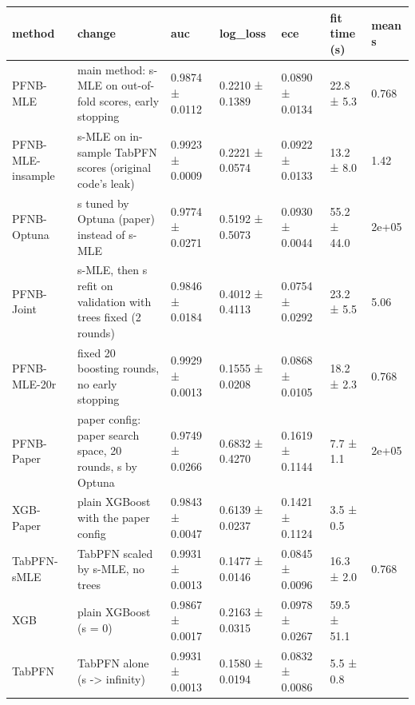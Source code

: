 \begin{tabular}{lllllll}
\toprule
method & change & auc & log\_loss & ece & fit time (s) & mean s \\
\midrule
PFNB-MLE & main method: s-MLE on out-of-fold scores, early stopping & 0.9874 ± 0.0112 & 0.2210 ± 0.1389 & 0.0890 ± 0.0134 & 22.8 ± 5.3 & 0.768 \\
PFNB-MLE-insample & s-MLE on in-sample TabPFN scores (original code's leak) & 0.9923 ± 0.0009 & 0.2221 ± 0.0574 & 0.0922 ± 0.0133 & 13.2 ± 8.0 & 1.42 \\
PFNB-Optuna & s tuned by Optuna (paper) instead of s-MLE & 0.9774 ± 0.0271 & 0.5192 ± 0.5073 & 0.0930 ± 0.0044 & 55.2 ± 44.0 & 2e+05 \\
PFNB-Joint & s-MLE, then s refit on validation with trees fixed (2 rounds) & 0.9846 ± 0.0184 & 0.4012 ± 0.4113 & 0.0754 ± 0.0292 & 23.2 ± 5.5 & 5.06 \\
PFNB-MLE-20r & fixed 20 boosting rounds, no early stopping & 0.9929 ± 0.0013 & 0.1555 ± 0.0208 & 0.0868 ± 0.0105 & 18.2 ± 2.3 & 0.768 \\
PFNB-Paper & paper config: paper search space, 20 rounds, s by Optuna & 0.9749 ± 0.0266 & 0.6832 ± 0.4270 & 0.1619 ± 0.1144 & 7.7 ± 1.1 & 2e+05 \\
XGB-Paper & plain XGBoost with the paper config & 0.9843 ± 0.0047 & 0.6139 ± 0.0237 & 0.1421 ± 0.1124 & 3.5 ± 0.5 &  \\
TabPFN-sMLE & TabPFN scaled by s-MLE, no trees & 0.9931 ± 0.0013 & 0.1477 ± 0.0146 & 0.0845 ± 0.0096 & 16.3 ± 2.0 & 0.768 \\
XGB & plain XGBoost (s = 0) & 0.9867 ± 0.0017 & 0.2163 ± 0.0315 & 0.0978 ± 0.0267 & 59.5 ± 51.1 &  \\
TabPFN & TabPFN alone (s -> infinity) & 0.9931 ± 0.0013 & 0.1580 ± 0.0194 & 0.0832 ± 0.0086 & 5.5 ± 0.8 &  \\
\bottomrule
\end{tabular}
